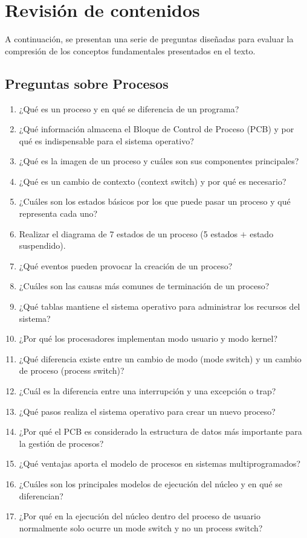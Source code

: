 \section{Revisión de contenidos}

A continuación, se presentan una serie de preguntas diseñadas para evaluar la compresión de los conceptos fundamentales presentados en el texto.

\subsection{Preguntas sobre Procesos}

\begin{enumerate}
  \item ¿Qué es un proceso y en qué se diferencia de un programa?
  \item ¿Qué información almacena el Bloque de Control de Proceso (PCB) y por qué es indispensable para el sistema operativo?
  \item ¿Qué es la imagen de un proceso y cuáles son sus componentes principales?
  \item ¿Qué es un cambio de contexto (context switch) y por qué es necesario?
  \item ¿Cuáles son los estados básicos por los que puede pasar un proceso y qué representa cada uno?
  \item Realizar el diagrama de 7 estados de un proceso (5 estados $+$ estado suspendido).
  \item ¿Qué eventos pueden provocar la creación de un proceso?
  \item ¿Cuáles son las causas más comunes de terminación de un proceso?
  \item ¿Qué tablas mantiene el sistema operativo para administrar los recursos del sistema?
  \item ¿Por qué los procesadores implementan modo usuario y modo kernel?
  \item ¿Qué diferencia existe entre un cambio de modo (mode switch) y un cambio de proceso (process switch)?
  \item ¿Cuál es la diferencia entre una interrupción y una excepción o trap?
  \item ¿Qué pasos realiza el sistema operativo para crear un nuevo proceso?
  \item ¿Por qué el PCB es considerado la estructura de datos más importante para la gestión de procesos?
  \item ¿Qué ventajas aporta el modelo de procesos en sistemas multiprogramados?
  \item ¿Cuáles son los principales modelos de ejecución del núcleo y en qué se diferencian?
  \item ¿Por qué en la ejecución del núcleo dentro del proceso de usuario normalmente solo ocurre un mode switch y no un process switch?
\end{enumerate}

